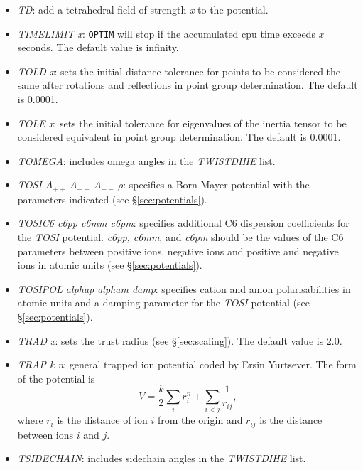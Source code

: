 \documentclass[12pt,a4paper,dvips]{article}
\begin{document}
\begin{itemize}
\item {\it TD\/}: add a tetrahedral field of strength {\it x} to the potential.

\item {\it TIMELIMIT x\/}: {\tt OPTIM} will stop if the accumulated cpu
time exceeds {\it x} seconds. The default value is infinity.

\item {\it TOLD x\/}: sets the initial distance tolerance for points
to be considered the same after rotations and reflections in point
group determination. The default is 0.0001.

\item {\it TOLE x\/}: sets the initial tolerance for eigenvalues
of the inertia tensor to be considered equivalent in point
group determination. The default is 0.0001.

\item {\it TOMEGA\/}: includes omega angles in the {\it TWISTDIHE\/} list.

\item {\it TOSI $A_{++}\ A_{--}\ A_{+-}\ \rho$\/}: specifies a Born-Mayer potential
with the parameters indicated (see \S\ref{sec:potentials}).

\item {\it TOSIC6 c6pp c6mm c6pm\/}: specifies additional C6 dispersion coefficients
for the {\it TOSI\/} potential. {\it c6pp, c6mm\/}, and  {\it c6pm\/} should be the values of the C6
parameters between positive ions, negative ions and positive and negative ions in atomic units
(see \S\ref{sec:potentials}).

\item {\it TOSIPOL alphap alpham damp\/}: specifies cation and anion polarisabilities in atomic units
and a damping parameter for the {\it TOSI\/} potential (see \S\ref{sec:potentials}).

\item {\it TRAD x\/}: sets the trust radius (see \S\ref{sec:scaling}). The default value is 2.0.

\item {\it TRAP k n\/}: general trapped ion potential coded by Ersin Yurtsever. 
The form of the potential is 
\begin{displaymath}
V=\frac{k}{2}\sum_i r_i^n + \sum_{i<j} \frac{1}{r_{ij}},
\end{displaymath}
where $r_i$ is the distance of ion $i$ from the origin and
$r_{ij}$ is the distance between ions $i$ and $j$.

\item {\it TSIDECHAIN\/}: includes sidechain angles in the {\it TWISTDIHE\/} list.


\end{itemize}
\end{document}
